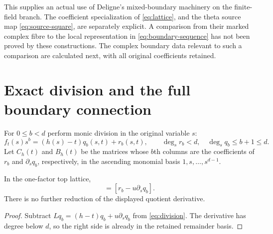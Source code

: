 This supplies an actual use of Deligne's mixed-boundary machinery on
the finite-field branch.  The coefficient specialization of
\eqref{eq:lattice}, and the theta source map
\eqref{eq:source-square}, are separately explicit.  A comparison from
their marked complex fibre to the local representation in
\eqref{eq:boundary-sequence} has not been proved by these constructions.
The complex boundary data relevant to such a comparison are calculated
next, with all original coefficients retained.

\section{Exact division and the full boundary connection}

For $0\le b<d$ perform monic division in the original variable $s$:
\begin{equation}
 f_t(s)s^b=(h(s)-t)q_b(s,t)+r_b(s,t),\qquad
 \deg_s r_b<d,\quad \deg_s q_b\le b+1\le d.
 \label{eq:division}
\end{equation}
Let $C_h(t)$ and $B_h(t)$ be the matrices whose $b$th columns are the
coefficients of $r_b$ and $\partial_s q_b$, respectively, in the
ascending monomial basis $1,s,\ldots,s^{d-1}$.

\begin{lemma}
In the one-factor top lattice,
\begin{equation}
 [f_t s^b]=[r_b-u\partial_s q_b].
 \label{eq:reduction}
\end{equation}
There is no further reduction of the displayed quotient derivative.
\end{lemma}
\begin{proof}
Subtract $Lq_b=(h-t)q_b+u\partial_s q_b$ from
\eqref{eq:division}.  The derivative has degree below $d$, so the
right side is already in the retained remainder basis.
\end{proof}

